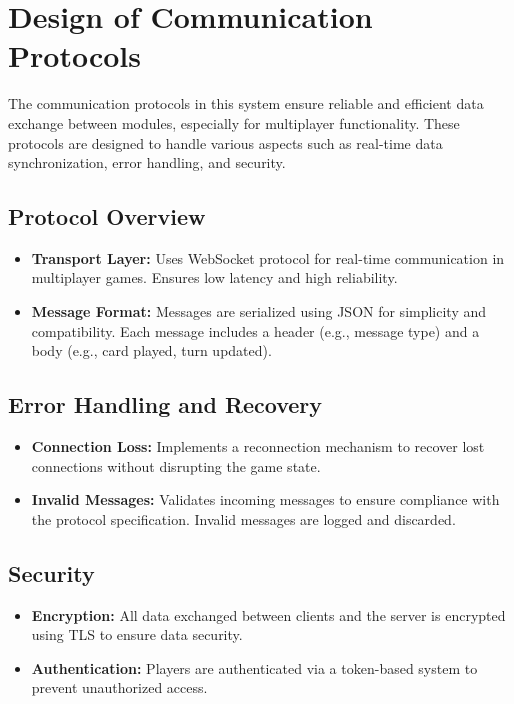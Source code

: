 \documentclass[12pt, titlepage]{article}
\begin{document}
\section{Design of Communication Protocols}

The communication protocols in this system ensure reliable and efficient data exchange between modules, especially for multiplayer functionality. These protocols are designed to handle various aspects such as real-time data synchronization, error handling, and security.

\subsection{Protocol Overview}
\begin{itemize}
    \item \textbf{Transport Layer:} Uses WebSocket protocol for real-time communication in multiplayer games. Ensures low latency and high reliability.
    \item \textbf{Message Format:} Messages are serialized using JSON for simplicity and compatibility. Each message includes a header (e.g., message type) and a body (e.g., card played, turn updated).
\end{itemize}

\subsection{Error Handling and Recovery}
\begin{itemize}
    \item \textbf{Connection Loss:} Implements a reconnection mechanism to recover lost connections without disrupting the game state.
    \item \textbf{Invalid Messages:} Validates incoming messages to ensure compliance with the protocol specification. Invalid messages are logged and discarded.
\end{itemize}

\subsection{Security}
\begin{itemize}
    \item \textbf{Encryption:} All data exchanged between clients and the server is encrypted using TLS to ensure data security.
    \item \textbf{Authentication:} Players are authenticated via a token-based system to prevent unauthorized access.
\end{itemize}
\end{document}
